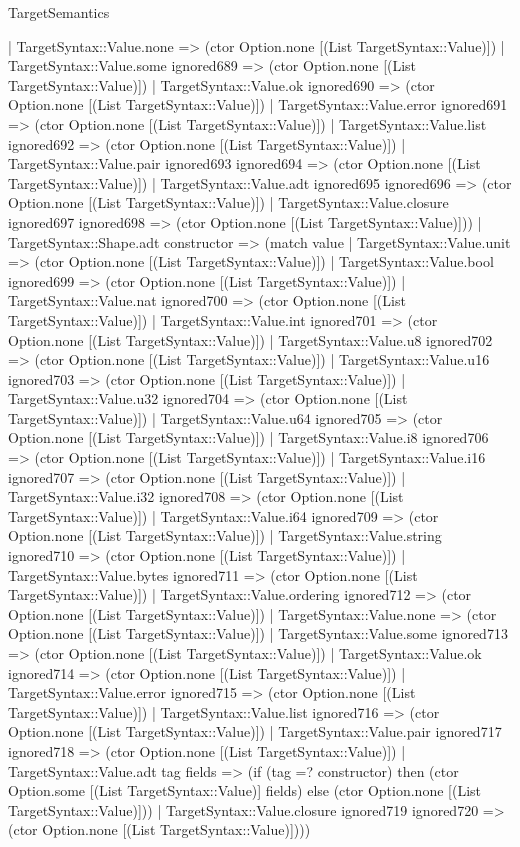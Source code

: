 \begin{lexlean}{TargetSemantics}
\begin{semanticmodule}
{      | TargetSyntax::Value.none => (ctor Option.none [(List TargetSyntax::Value)])
      | TargetSyntax::Value.some ignored689 => (ctor Option.none [(List TargetSyntax::Value)])
      | TargetSyntax::Value.ok ignored690 => (ctor Option.none [(List TargetSyntax::Value)])
      | TargetSyntax::Value.error ignored691 => (ctor Option.none [(List TargetSyntax::Value)])
      | TargetSyntax::Value.list ignored692 => (ctor Option.none [(List TargetSyntax::Value)])
      | TargetSyntax::Value.pair ignored693 ignored694 => (ctor Option.none [(List TargetSyntax::Value)])
      | TargetSyntax::Value.adt ignored695 ignored696 => (ctor Option.none [(List TargetSyntax::Value)])
      | TargetSyntax::Value.closure ignored697 ignored698 => (ctor Option.none [(List TargetSyntax::Value)]))
    | TargetSyntax::Shape.adt constructor => (match value
      | TargetSyntax::Value.unit => (ctor Option.none [(List TargetSyntax::Value)])
      | TargetSyntax::Value.bool ignored699 => (ctor Option.none [(List TargetSyntax::Value)])
      | TargetSyntax::Value.nat ignored700 => (ctor Option.none [(List TargetSyntax::Value)])
      | TargetSyntax::Value.int ignored701 => (ctor Option.none [(List TargetSyntax::Value)])
      | TargetSyntax::Value.u8 ignored702 => (ctor Option.none [(List TargetSyntax::Value)])
      | TargetSyntax::Value.u16 ignored703 => (ctor Option.none [(List TargetSyntax::Value)])
      | TargetSyntax::Value.u32 ignored704 => (ctor Option.none [(List TargetSyntax::Value)])
      | TargetSyntax::Value.u64 ignored705 => (ctor Option.none [(List TargetSyntax::Value)])
      | TargetSyntax::Value.i8 ignored706 => (ctor Option.none [(List TargetSyntax::Value)])
      | TargetSyntax::Value.i16 ignored707 => (ctor Option.none [(List TargetSyntax::Value)])
      | TargetSyntax::Value.i32 ignored708 => (ctor Option.none [(List TargetSyntax::Value)])
      | TargetSyntax::Value.i64 ignored709 => (ctor Option.none [(List TargetSyntax::Value)])
      | TargetSyntax::Value.string ignored710 => (ctor Option.none [(List TargetSyntax::Value)])
      | TargetSyntax::Value.bytes ignored711 => (ctor Option.none [(List TargetSyntax::Value)])
      | TargetSyntax::Value.ordering ignored712 => (ctor Option.none [(List TargetSyntax::Value)])
      | TargetSyntax::Value.none => (ctor Option.none [(List TargetSyntax::Value)])
      | TargetSyntax::Value.some ignored713 => (ctor Option.none [(List TargetSyntax::Value)])
      | TargetSyntax::Value.ok ignored714 => (ctor Option.none [(List TargetSyntax::Value)])
      | TargetSyntax::Value.error ignored715 => (ctor Option.none [(List TargetSyntax::Value)])
      | TargetSyntax::Value.list ignored716 => (ctor Option.none [(List TargetSyntax::Value)])
      | TargetSyntax::Value.pair ignored717 ignored718 => (ctor Option.none [(List TargetSyntax::Value)])
      | TargetSyntax::Value.adt tag fields => (if (tag =? constructor) then (ctor Option.some [(List TargetSyntax::Value)] fields) else (ctor Option.none [(List TargetSyntax::Value)]))
      | TargetSyntax::Value.closure ignored719 ignored720 => (ctor Option.none [(List TargetSyntax::Value)])))
}


\end{semanticmodule}
\end{lexlean}
